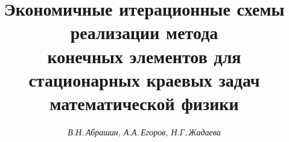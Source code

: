










\newcommand{\const}{\operatorname{const}}


\newcommand{\ussa}{{\overset{s+1}{u}{}^{(\alpha)}}}


\newcommand{\ussb}{{\overset{s+1}{u}{}^{(\beta)}}}


\newcommand{\usva}{{\overset{s}{u}{}^{(\alpha)}}}


\newcommand{\usvb}{{\overset{s}{u}{}^{(\beta)}}}


\newcommand{\usa}{{\overset{s}{u}_{\alpha}}}


\newcommand{\usb}{{\overset{s}{u}_{\beta}}}


\newcommand{\ussat}{{\overset{s+1}{u}{}_{\!\!\!t}^{(\alpha)}}}


\newcommand{\ussbt}{{\overset{s+1}{u}{}_{\!\!\!t}^{(\beta)}}}


\newcommand{\tts}[1]{}







\setcounter{page}{3}


















\author{\it В.Н.\,Абрашин, А.А.\,Егоров, Н.Г.\,Жадаева}




\title{Экономичные итерационные схемы реализации метода \\


конечных элементов для стационарных краевых задач \\


математической физики}





